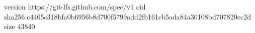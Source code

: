 version https://git-lfs.github.com/spec/v1
oid sha256:c4465c318bfa0b6956b8d700f5799add2fb161cb5ada84a30108bd707820cc2d
size 43840
